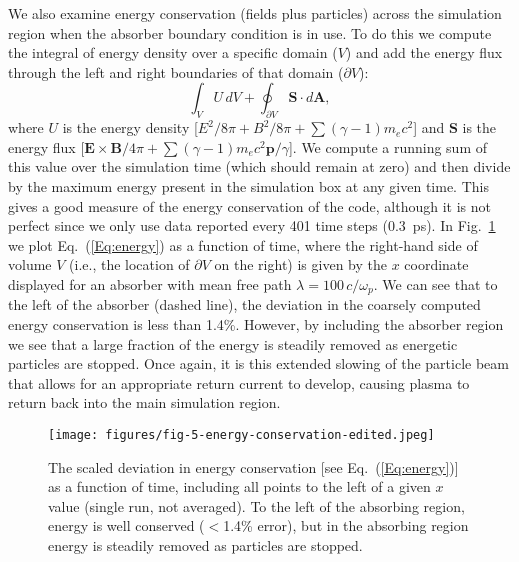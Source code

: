 \documentclass[../absorber.tex]{subfiles}
\begin{document}
We also examine energy conservation (fields plus particles) across the simulation region when the absorber boundary condition is in use.  To do this we compute the integral of energy density over a specific domain ($V$) and add the energy flux through the left and right boundaries of that domain ($\partial V$):
\begin{equation} \label{Eq:energy}
    \int_V U\,dV + \oint_{\partial V} \mathbf{S} \cdot d\mathbf{A},
\end{equation}
where $U$ is the energy density [$E^2/8\pi + B^2/8\pi + \sum (\gamma-1)m_e c^2$] and $\mathbf{S}$ is the energy flux [$\mathbf{E}\times \mathbf{B}/4\pi + \sum (\gamma-1)m_ec^2 \mathbf{p}/\gamma$].  We compute a running sum of this value over the simulation time (which should remain at zero) and then divide by the maximum energy present in the simulation box at any given time.  This gives a good measure of the energy conservation of the code, although it is not perfect since we only use data reported every 401 time steps (0.3~ps).  In Fig.~\ref{fig:energy} we plot Eq.~(\ref{Eq:energy}) as a function of time, where the right-hand side of volume $V$ (i.e., the location of $\partial V$ on the right) is given by the $x$ coordinate displayed for an absorber with mean free path $\lambda=100\,c/\omega_p$.  We can see that to the left of the absorber (dashed line), the deviation in the coarsely computed energy conservation is less than 1.4\%.  However, by including the absorber region we see that a large fraction of the energy is steadily removed as energetic particles are stopped.  Once again, it is this extended slowing of the particle beam that allows for an appropriate return current to develop, causing plasma to return back into the main simulation region.

\begin{figure}
\texttt{[image: figures/fig-5-energy-conservation-edited.jpeg]}
\caption{\label{fig:energy} The scaled deviation in energy conservation [see Eq.~(\ref{Eq:energy})] as a function of time, including all points to the left of a given $x$ value (single run, not averaged).  To the left of the absorbing region, energy is well conserved ($<$1.4\% error), but in the absorbing region energy is steadily removed as particles are stopped.}
\end{figure}

\end{document}
